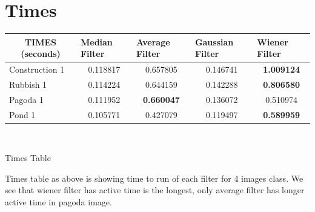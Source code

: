 \section*{Times}
\vspace{2cm}
\begin{center}

\begin{tabular}{|l|l|l|c|l|l|c|l|l|c|l|l|c|l|l|}
\hline
\multicolumn{3}{|c|}{TIMES (seconds)}      & \multicolumn{3}{l|}{Median Filter} & \multicolumn{3}{l|}{Average Filter}    & \multicolumn{3}{l|}{Gaussian Filter} & \multicolumn{3}{l|}{Wiener Filter}     \\ \hline
\multicolumn{3}{|l|}{Construction 1} & \multicolumn{3}{c|}{0.118817}      & \multicolumn{3}{c|}{0.657805}          & \multicolumn{3}{c|}{0.146741}        & \multicolumn{3}{c|}{\textbf{1.009124}} \\ \hline
\multicolumn{3}{|l|}{Rubbish 1}      & \multicolumn{3}{c|}{0.114224}      & \multicolumn{3}{c|}{0.644159}          & \multicolumn{3}{c|}{0.142288}        & \multicolumn{3}{c|}{\textbf{0.806580}} \\ \hline
\multicolumn{3}{|l|}{Pagoda 1}       & \multicolumn{3}{c|}{0.111952}      & \multicolumn{3}{c|}{\textbf{0.660047}} & \multicolumn{3}{c|}{0.136072}        & \multicolumn{3}{c|}{0.510974}          \\ \hline
\multicolumn{3}{|l|}{Pond 1}         & \multicolumn{3}{c|}{0.105771}      & \multicolumn{3}{c|}{0.427079}          & \multicolumn{3}{c|}{0.119497}        & \multicolumn{3}{c|}{\textbf{0.589959}} \\ \hline
\end{tabular}

\

Times Table
\end{center}
 
Times table as above is showing time to run of each filter for 4 images class. We see that wiener filter has active time is the longest, only average filter has longer active time in pagoda image.


